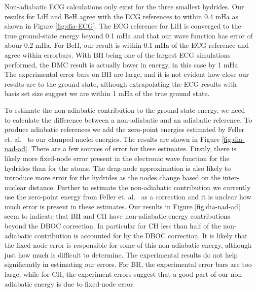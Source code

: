 \documentclass[pra,superscriptaddress,groupedaddress,twocolumn]{revtex4}
\begin{document}
Non-adiabatic ECG calculations only exist for the three smallest hydrides. Our results for LiH and BeH agree with the ECG references to within 0.4 mHa as shown in Figure \ref{fig:dia-ECG}. The ECG reference for LiH is converged to the true ground-state energy beyond 0.1 mHa and that our wave function has error of abour 0.2 mHa. For BeH, our result is within 0.1 mHa of the ECG reference and agree within errorbars. With BH being one of the largest ECG simulations performed, the DMC result is actually lower in energy, in this case by 1 mHa. The experimental error bars on BH are large, and it is not evident how close our results are to the ground state, although extrapolating the ECG results with basis set size suggest we are within 1 mHa of the true ground state.~\cite{Bubin_BeH_noBO} %

To estimate the non-adiabatic contribution to the ground-state energy, we need to calculate the difference between a non-adiabatic and an adiabatic reference. To produce adiabatic references we add the zero-point energies estimated by Feller et. al.~\cite{Feller_Corrections} to our clamped-nuclei energies. The results are shown in Figure \ref{fig:dia-nad-ad}. There are a few sources of error for these estimates. Firstly, there is likely more fixed-node error present in the electronic wave function for the hydrides than for the atoms. The drag-node approximation is also likely to introduce more error for the hydrides as the nodes change based on the inter-nuclear distance. Further to estimate the non-adiabatic contribution we currently use the zero-point energy from Feller et. al.~\cite{Feller_Corrections} as a correction and it is unclear how much error is present in these estimates. Our results in Figure \ref{fig:dia-nad-ad} seem to indicate that BH and CH have non-adiabatic energy contributions beyond the DBOC correction.  In particular for CH less than half of the non-adiabatic contribution is accounted for by the DBOC correction.  It is likely that the fixed-node error is responsible for some of this non-adiabatic energy, although just how much is difficult to determine.   The experimental results do not help significantly in estimating our errors.  For BH, the experimental error bars are too large, while for CH, the experiment errors suggest that a good part of our non-adiabatic energy is due to fixed-node error.

\end{document}
